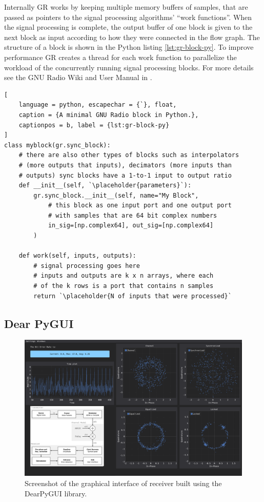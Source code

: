 Internally GR works by keeping multiple memory buffers of samples, that are passed as pointers to the signal processing algorithms' ``work functions''. When the signal processing is complete, the output buffer of one block is given to the next block as input according to how they were connected in the flow graph. The structure of a block is shown in the Python listing \ref{lst:gr-block-py}. To improve performance GR creates a thread for each work function to parallelize the workload of the concurrently running signal processing blocks. For more details see the GNU Radio Wiki and User Manual in \cite{GRWiki}.

{\newcommand{\placeholder}[1]{\textit{\(\langle\)\,\textrm{#1}\,\(\rangle\)}}
\begin{lstlisting}[
	language = python, escapechar = {`}, float,
	caption = {A minimal GNU Radio block in Python.},
	captionpos = b, label = {lst:gr-block-py}
]
class myblock(gr.sync_block):
	# there are also other types of blocks such as interpolators 
	# (more outputs that inputs), decimators (more inputs than 
	# outputs) sync blocks have a 1-to-1 input to output ratio
	def __init__(self, `\placeholder{parameters}`):
		gr.sync_block.__init__(self, name="My Block",
			# this block as one input port and one output port
			# with samples that are 64 bit complex numbers
			in_sig=[np.complex64], out_sig=[np.complex64]
		)

	def work(self, inputs, outputs):
		# signal processing goes here
		# inputs and outputs are k x n arrays, where each
		# of the k rows is a port that contains n samples
		return `\placeholder{N of inputs that were processed}`
\end{lstlisting}}

\subsection{Dear PyGUI}\label{sec:GUI}

\begin{figure}
	\centering
	\includegraphics[frame, width = \linewidth]{figures/screenshots/gui_screenshot}
	\caption{Screenshot of the graphical interface of receiver built using the DearPyGUI library.}
\end{figure}

